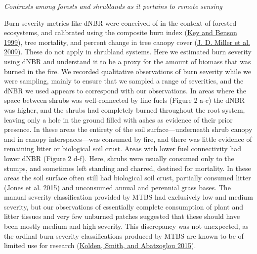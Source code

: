 \documentclass[
  12pt,
]{article}
\begin{document}
\emph{Contrasts among forests and shrublands as it pertains to remote
sensing}

Burn severity metrics like dNBR were conceived of in the context of
forested ecosystems, and calibrated using the composite burn index
(\protect\hyperlink{ref-Key1999}{Key and Benson 1999}), tree mortality,
and percent change in tree canopy cover
(\protect\hyperlink{ref-Miller2009}{J. D. Miller et al. 2009}). These do
not apply in shrubland systems. Here we estimated burn severity using
dNBR and understand it to be a proxy for the amount of biomass that was
burned in the fire. We recorded qualitative observations of burn
severity while we were sampling, mainly to ensure that we sampled a
range of severities, and the dNBR we used appears to correspond with our
observations. In areas where the space between shrubs was well-connected
by fine fuels (Figure 2 a-c) the dNBR was higher, and the shrubs had
completely burned throughout the root system, leaving only a hole in the
ground filled with ashes as evidence of their prior presence. In these
areas the entirety of the soil surface---underneath shrub canopy and in
canopy interspaces---was consumed by fire, and there was little evidence
of remaining litter or biological soil crust. Areas with lower fuel
connectivity had lower dNBR (Figure 2 d-f). Here, shrubs were usually
consumed only to the stumps, and sometimes left standing and charred,
destined for mortality. In these areas the soil surface often still had
biological soil crust, partially consumed litter
(\protect\hyperlink{ref-Jones2015}{Jones et al. 2015}) and unconsumed
annual and perennial grass bases. The manual severity classification
provided by MTBS had exclusively low and medium severity, but our
observations of essentially complete consumption of plant and litter
tissues and very few unburned patches suggested that these should have
been mostly medium and high severity. This discrepancy was not
unexpected, as the ordinal burn severity classifications produced by
MTBS are known to be of limited use for research
(\protect\hyperlink{ref-Kolden2015}{Kolden, Smith, and Abatzoglou
2015}).
\end{document}
